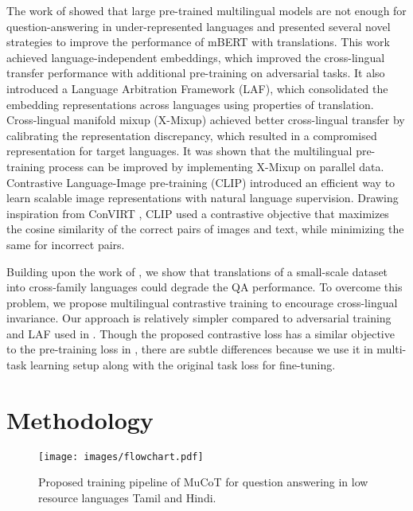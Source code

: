 \documentclass[11pt]{article}
\begin{document}
The work of \citet{bornea2020multilingual} showed that large pre-trained multilingual models are not enough for question-answering in under-represented languages and presented several novel strategies to improve the performance of mBERT with translations. This work achieved language-independent embeddings, which improved the cross-lingual transfer performance with additional pre-training on adversarial tasks. It also introduced a Language Arbitration Framework (LAF), which consolidated the embedding representations across languages using properties of translation. Cross-lingual manifold mixup (X-Mixup) \cite{yang2021enhancing} achieved better cross-lingual transfer by calibrating the representation discrepancy, which resulted in a compromised representation for target languages. It was shown that the multilingual pre-training process can be improved by implementing X-Mixup on parallel data. Contrastive Language-Image pre-training (CLIP) \cite{radford2021learning} introduced an efficient way to learn scalable image representations with natural language supervision. Drawing inspiration from ConVIRT \cite{zhang2020contrastive}, CLIP used a contrastive objective that maximizes the cosine similarity of the correct pairs of images and text, while minimizing the same for incorrect pairs.

Building upon the work of \cite{bornea2020multilingual}, we show that translations of a small-scale dataset into cross-family languages could degrade the QA performance. To overcome this problem, we propose multilingual contrastive training to encourage cross-lingual invariance. Our approach is relatively simpler compared to adversarial training and LAF used in \citet{bornea2020multilingual}. Though the proposed contrastive loss has a similar objective to the pre-training loss in \cite{guo-etal-2018-effective}, there are subtle differences because we use it in multi-task learning setup along with the original task loss for fine-tuning.

\section{Methodology}

\begin{figure*}[ht]
\centering
   \texttt{[image: images/flowchart.pdf]}
   \caption{Proposed training pipeline of MuCoT for question answering in low resource languages Tamil and Hindi.}
   \label{fig:framework}
\end{figure*}
\end{document}
